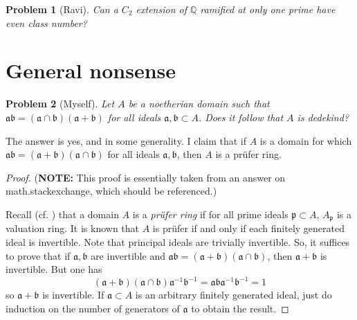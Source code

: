 \documentclass{article}
\newtheorem{problem}{Problem}
\newcommand{\dQ}{\mathbb{Q}}
\newcommand{\fa}{\mathfrak{a}}
\newcommand{\fb}{\mathfrak{b}}
\newcommand{\fp}{\mathfrak{p}}
\begin{document}
\begin{problem}[Ravi]
Can a $C_2$ extension of $\dQ$ ramified at only one prime have even class 
number?
\end{problem}










\section{General nonsense}





\begin{problem}[Myself]
Let $A$ be a noetherian domain such that $\fa\fb=(\fa\cap\fb)(\fa+\fb)$ for 
all ideals $\fa,\fb\subset A$. Does it follow that $A$ is dedekind? 
\end{problem}
The answer is yes, and in some generality. I claim that if $A$ is a domain for 
which $\fa\fb=(\fa+\fb)(\fa\cap\fb)$ for all ideals $\fa,\fb$, then $A$ is a 
pr\"ufer ring. 
\begin{proof}
(\textbf{NOTE:} This proof is essentially taken from an answer on 
math.stackexchange, which should be referenced.)

Recall (cf. \cite[VII \S 2 ex.12]{Bou}) that a domain $A$ is a \emph{pr\"ufer 
ring} if for all prime ideals $\fp\subset A$, $A_\fp$ is a valuation ring. It 
is known that $A$ is pr\"ufer if and only if each finitely generated ideal 
is invertible. Note that principal ideals are trivially invertible. So, it 
suffices to prove that if $\fa,\fb$ are invertible and 
$\fa\fb=(\fa+\fb)(\fa\cap\fb)$, then $\fa+\fb$ is invertible. But one has 
\[
  (\fa+\fb)(\fa\cap\fb)\fa^{-1}\fb^{-1} = \fa\fb\fa^{-1}\fb^{-1} = 1
\]
so $\fa+\fb$ is invertible. If $\fa\subset A$ is an arbitrary finitely 
generated ideal, just do induction on the number of generators of $\fa$ to 
obtain the result. 
\end{proof}
\end{document}
